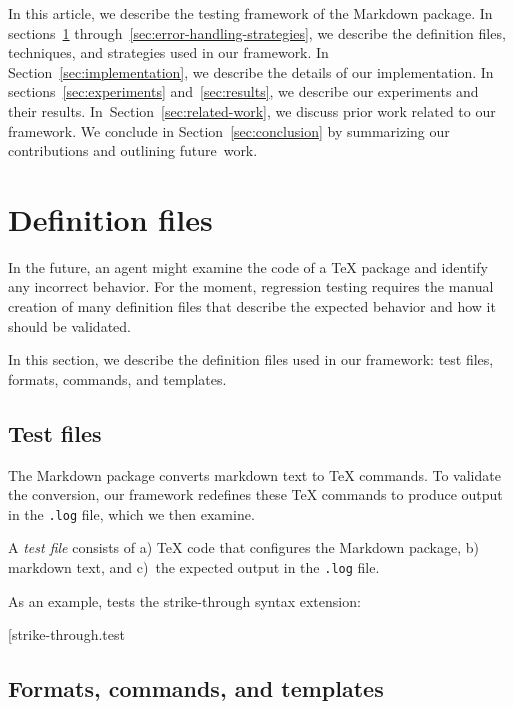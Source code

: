 \documentclass[final]{ltugboat}
\begin{document}
In this article, we describe the testing framework of the Markdown package. In sections~\ref{sec:definition-files} through~\ref{sec:error-handling-strategies}, we describe the definition files, techniques, and strategies used in our framework. In Section~\ref{sec:implementation}, we describe the details of our implementation. In sections~\ref{sec:experiments} and~\ref{sec:results}, we describe our experiments and their results. In~Section~\ref{sec:related-work}, we discuss prior work related to our framework. We conclude in Section~\ref{sec:conclusion} by summarizing our contributions and outlining future~work.

\section{Definition files}
\label{sec:definition-files}

In the future, an  agent might examine the code of a \TeX{} package and identify any incorrect behavior. For the moment, regression testing requires the manual creation of many definition files that describe the expected behavior and how it should be validated.

In this section, we describe the definition files used in our framework: test files, formats, commands, and templates.

\subsection{Test files}
\label{sec:test-files}

The Markdown package converts markdown text to \TeX{} commands. To validate the conversion, our framework redefines these \TeX{} commands to produce output in the \texttt{.log} file, which we then examine.

A \emph{test file} consists of a) \TeX{} code that configures the Markdown package, b) markdown text, and c)~the expected output in the \texttt{.log} file.

As an example,  tests the strike-through syntax extension:

\smallskip
\noindent
\example*[{strike-through.test}

\subsection{Formats, commands, and templates}
\label{sec:formats-commands-and-templates}
\end{document}
